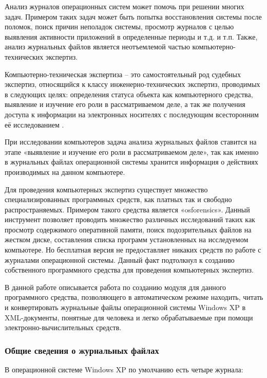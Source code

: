 Анализ журналов операционных систем может помочь при решении многих задач. Примером таких задач может быть попытка восстановления системы после поломок, поиск причин неполадок системы, просмотр журналов с целью выявления активности приложений в определенные периоды и т.д. и т.п. Также, анализ журнальных файлов является неотъемлемой частью компьютерно-технических экспертиз.

Компьютерно-техническая экспертиза – это самостоятельный род судебных экспертиз, относящийся к классу инженерно-технических экспертиз, проводимых в следующих целях: определения статуса объекта как компьютерного средства, выявление и изучение его роли в рассматриваемом деле, а так же получения доступа к информации на электронных носителях с последующим всесторонним её исследованием \cite{fedotovforenzika}. 

При исследовании компьютеров задача анализа журнальных файлов ставится на этапе «выявление и изучение его роли в рассматриваемом деле», так как именно в журнальных файлах операционной системы хранится информация о действиях производимых на данном компьютере.

Для проведения компьютерных экспертиз существует множество специализированных программных средств, как платных так и свободно распространяемых. Примером такого средства является «osforensics». Данный инструмент позволяет проводить множество различных исследований таких как просмотр содержимого оперативной памяти, поиск подозрительных файлов на жестком диске, составления списка программ установленных на исследуемом компьютере. Но бесплатная версия не предоставляет никаких средств по работе с журналами операционной системы. Данный факт подтолкнул к созданию собственного программного средства для проведения компьютерных экспертиз.

В данной работе описывается работа по созданию модуля для данного программного средства, позволяющего в автоматическом режиме находить, читать и конвертировать журнальные файлы операционной системы Windows XP в XML-документы, понятные для человека и легко обрабатываемые при помощи\\ электронно-вычислительных средств.

\subsubsection{Общие сведения о журнальных файлах}

В операционной системе Windows XP по умолчанию есть четыре журнала:

